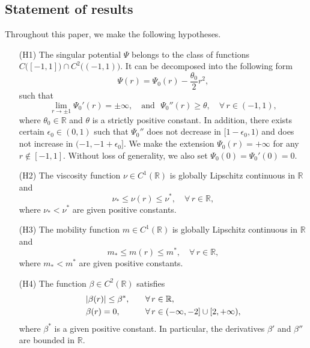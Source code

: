 \documentclass[11pt,reqno]{amsart}
\def\be{\begin{equation}}
\def\ee{\end{equation}}
\begin{document}
\subsection{Statement of results}
%
Throughout this paper, we make the following hypotheses. \smallskip
%
\begin{itemize}
\item[(H1)] The singular potential $\Psi$ belongs to the class of functions $C\big([-1,1]\big)\cap C^{2}\big((-1,1)\big)$. It can be decomposed into the following form
%
\begin{equation}
\Psi(r)=\Psi_{0}(r)-\frac{\theta_{0}}{2}r^2,\nonumber
\end{equation}
%
such that
%
\begin{equation}
\lim_{r\to \pm 1} \Psi_{0}'(r)=\pm \infty ,\quad \text{and}\ \ \   \Psi_{0}''(r)\ge \theta,\quad \forall\, r\in (-1,1),\nonumber
\end{equation}
%
where $\theta_0\in \mathbb{R}$ and $\theta$ is a strictly positive constant. In addition, there exists certain $\epsilon_0\in(0,1)$ such that $\Psi_{0}''$ does not decrease in $[1-\epsilon_0,1)$ and does not increase in $(-1,-1+\epsilon_0]$. We make the extension $\Psi_{0}(r)=+\infty$ for any $r\notin[-1,1]$. Without loss of generality, we also set $\Psi_0(0)=\Psi_0'(0)=0$. \smallskip
%
\item[(H2)] The viscosity function $\nu\in C^{1}(\mathbb{R})$ is globally Lipschitz continuous in $\mathbb{R}$ and
\be
\nu_{*} \leq \nu(r)\leq \nu^*,\quad \forall\, r \in \mathbb{R},\nonumber
\ee
where $\nu_{*}<\nu^*$ are given positive constants. \smallskip
%
\item[(H3)] The mobility function $m\in C^{1}(\mathbb{R})$ is globally Lipschitz continuous in $\mathbb{R}$ and
\be
m_{*} \leq m(r)\leq m^*,\quad \forall\, r \in \mathbb{R},\nonumber
\ee
where $m_{*}<m^*$ are given positive constants. \smallskip
%
\item[(H4)] The function $\beta \in C^{2}(\mathbb{R})$ satisfies
\be
\begin{aligned}
&|\beta(r)| \leq \beta^*, &&\quad \forall\, r \in \mathbb{R},
\notag\\
&\beta(r)=0,&&\quad \forall\, r\in (-\infty,-2]\cup [2, +\infty),
\end{aligned}
\ee
where $\beta^*$ is a given positive constant. In particular, the derivatives $\beta'$ and $\beta''$ are bounded in $\mathbb{R}$.
\end{itemize}
\end{document}
